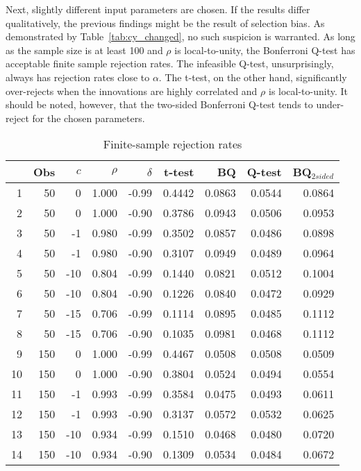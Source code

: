 \documentclass[11pt, a4paper]{article}
\begin{document}
Next, slightly different input parameters are chosen. If the results differ qualitatively, the previous findings might be the result of selection bias. As demonstrated by Table~\vref{tab:cy_changed}, no such suspicion is warranted. As long as the sample size is at least 100 and $\rho$ is local-to-unity, the Bonferroni Q-test has acceptable finite sample rejection rates. The infeasible Q-test, unsurprisingly, always has rejection rates close to $\alpha$. The t-test, on the other hand, significantly over-rejects when the innovations are highly correlated and $\rho$ is local-to-unity. It should be noted, however, that the two-sided Bonferroni Q-test tends to under-reject for the chosen parameters. 
\begin{table}[h!]
\caption{Finite-sample rejection rates}
\centering
\label{tab:cy_changed}
\begin{threeparttable}
\begin{tabular}{rrrrrrrrr}
  \hline
 & Obs & $c$ & $\rho$ & $\delta$ & t-test & BQ& Q-test & BQ$_{{2sided}}$ \\ 
  \hline
1 & 50 & 0 & 1.000 & -0.99 & 0.4442 & 0.0863 & 0.0544 & 0.0864 \\ 
  2 & 50 & 0 & 1.000 & -0.90 & 0.3786 & 0.0943 & 0.0506 & 0.0953 \\ 
  3 & 50 & -1 & 0.980 & -0.99 & 0.3502 & 0.0857 & 0.0486 & 0.0898 \\ 
  4 & 50 & -1 & 0.980 & -0.90 & 0.3107 & 0.0949 & 0.0489 & 0.0964 \\ 
  5 & 50 & -10 & 0.804 & -0.99 & 0.1440 & 0.0821 & 0.0512 & 0.1004 \\ 
  6 & 50 & -10 & 0.804 & -0.90 & 0.1226 & 0.0840 & 0.0472 & 0.0929 \\ 
  7 & 50 & -15 & 0.706 & -0.99 & 0.1114 & 0.0895 & 0.0485 & 0.1112 \\ 
  8 & 50 & -15 & 0.706 & -0.90 & 0.1035 & 0.0981 & 0.0468 & 0.1112 \\ 
  9 & 150 & 0 & 1.000 & -0.99 & 0.4467 & 0.0508 & 0.0508 & 0.0509 \\ 
  10 & 150 & 0 & 1.000 & -0.90 & 0.3804 & 0.0524 & 0.0494 & 0.0554 \\ 
  11 & 150 & -1 & 0.993 & -0.99 & 0.3584 & 0.0475 & 0.0493 & 0.0611 \\ 
  12 & 150 & -1 & 0.993 & -0.90 & 0.3137 & 0.0572 & 0.0532 & 0.0625 \\ 
  13 & 150 & -10 & 0.934 & -0.99 & 0.1510 & 0.0468 & 0.0480 & 0.0720 \\ 
  14 & 150 & -10 & 0.934 & -0.90 & 0.1309 & 0.0534 & 0.0484 & 0.0672 \\ 

\end{tabular}
\end{threeparttable}
\end{table}
\end{document}
